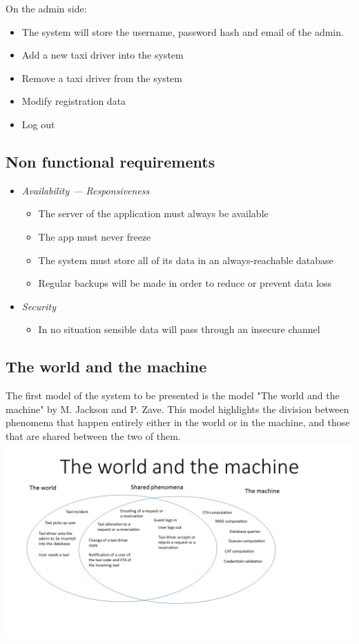 \documentclass{article}
\begin{document}
On the admin side:\@
\begin{itemize}
	\item The system will store the username, password hash and email of the admin.
	\item Add a new taxi driver into the system
	\item Remove a taxi driver from the system
	\item Modify registration data
	\item Log out
\end{itemize}
\subsection{Non functional requirements}
\begin{itemize}
	\item \textit{Availability --- Responsiveness}
		\begin{itemize}
			\item The server of the application must always be available
			\item The app must never freeze 
			\item The system must store all of its data in an always-reachable database
			\item Regular backups will be made in order to reduce or prevent data loss
		\end{itemize}
	\item \textit{Security}
		\begin{itemize}
			\item In no situation sensible data will pass through an insecure channel
		\end{itemize}
\end{itemize}
\subsection{The world and the machine}
The first model of the system to be presented is the model "The world and the machine" by M. Jackson and P. Zave. This model highlights the division between phenomena that happen entirely either in the world or in the machine, and those that are shared between the two of them.
\includegraphics[width=.9\textwidth,height=.9\textheight,keepaspectratio]{TWATM}
\end{document}
